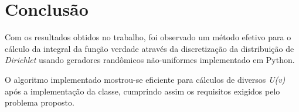 \documentclass{article}
\begin{document}
\section{Conclusão}

Com os resultados obtidos no trabalho, foi observado um método efetivo para o cálculo da integral da função verdade através da discretização da distribuição de \textit{Dirichlet} usando geradores randômicos não-uniformes implementado em Python. 

O algoritmo implementado mostrou-se eficiente para cálculos de diversos \textit{U(v)} após a implementação da classe, cumprindo assim os requisitos exigidos pelo problema proposto.

\newpage


\end{document}
